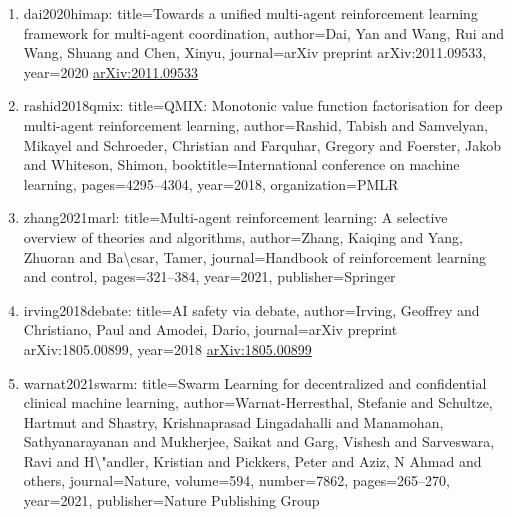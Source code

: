 \documentclass[11pt]{article}
\begin{document}
\begin{enumerate}[leftmargin=*]
  \item dai2020himap: title=Towards a unified multi-agent reinforcement learning framework for multi-agent coordination, author=Dai, Yan and Wang, Rui and Wang, Shuang and Chen, Xinyu, journal=arXiv preprint arXiv:2011.09533, year=2020 \href{https://arxiv.org/abs/2011.09533}{arXiv:2011.09533}
  \item rashid2018qmix: title=QMIX: Monotonic value function factorisation for deep multi-agent reinforcement learning, author=Rashid, Tabish and Samvelyan, Mikayel and Schroeder, Christian and Farquhar, Gregory and Foerster, Jakob and Whiteson, Shimon, booktitle=International conference on machine learning, pages=4295--4304, year=2018, organization=PMLR
  \item zhang2021marl: title=Multi-agent reinforcement learning: A selective overview of theories and algorithms, author=Zhang, Kaiqing and Yang, Zhuoran and Ba\textbackslash{}csar, Tamer, journal=Handbook of reinforcement learning and control, pages=321--384, year=2021, publisher=Springer
  \item irving2018debate: title=AI safety via debate, author=Irving, Geoffrey and Christiano, Paul and Amodei, Dario, journal=arXiv preprint arXiv:1805.00899, year=2018 \href{https://arxiv.org/abs/1805.00899}{arXiv:1805.00899}
  \item warnat2021swarm: title=Swarm Learning for decentralized and confidential clinical machine learning, author=Warnat-Herresthal, Stefanie and Schultze, Hartmut and Shastry, Krishnaprasad Lingadahalli and Manamohan, Sathyanarayanan and Mukherjee, Saikat and Garg, Vishesh and Sarveswara, Ravi and H\textbackslash{}"andler, Kristian and Pickkers, Peter and Aziz, N Ahmad and others, journal=Nature, volume=594, number=7862, pages=265--270, year=2021, publisher=Nature Publishing Group
\end{enumerate}

% 
% 
\end{document}
